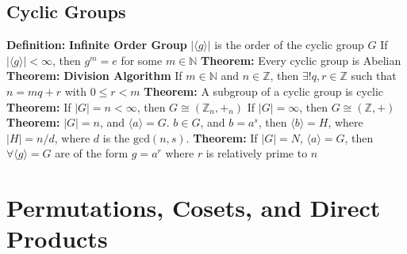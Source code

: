 \documentclass[14pt]{extarticle}
\def\Definition{{\color{blue} \textbf{Definition:} }}
\def\Theorem{{\color{red} \textbf{Theorem:} }}
\begin{document}
\begin{outline}
	\subsection*{Cyclic Groups}	
		\1	\Definition \textbf{Infinite Order Group}
			\2 $|\langle g \rangle|$ is the order of the cyclic group $G$
			\2	If $|\langle g \rangle| < \infty$, then $g^m = e$ for some $m \in \mathbb{N}$
		\1	\Theorem Every cyclic group is Abelian
		\1	\Theorem \textbf{Division Algorithm}
			\2	If $m \in \mathbb{N}$ and $n \in \mathbb{Z}$, then $\exists! q,r \in \mathbb{Z}$
					such that $n = m q + r$ with $0 \le r < m$
		\1	\Theorem A subgroup of a cyclic group is cyclic
		\1	\Theorem If $|G| = n < \infty$, then $G \cong (\mathbb{Z}_n,+_n)$
			\2	If $|G| = \infty$, then $G \cong (\mathbb{Z},+)$
		\1	\Theorem $|G| = n$, and $\langle a \rangle = G$.  $b \in G$, and $b = a^s$,
				then $\langle b \rangle = H$, where $|H| = n/d$, where $d$ is the $\text{gcd}(n,s)$.
		\1	\Theorem If $|G| = N$, $\langle a \rangle = G$, then $\forall \langle g \rangle = G$
				are of the form $g = a^r$ where $r$ is relatively prime to $n$
	
\section*{Permutations, Cosets, and Direct Products}

\end{outline}
\end{document}
